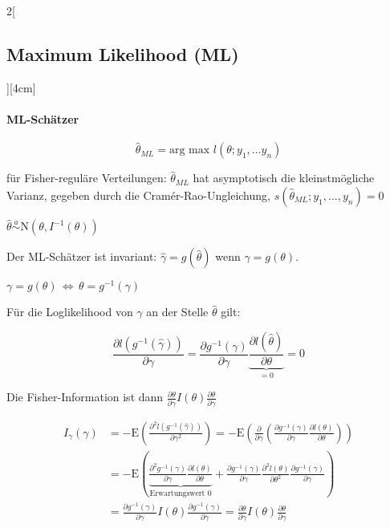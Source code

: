 \documentclass[8pt]{extarticle}
\begin{document}
\begin{multicols}{2}[\subsection{Maximum Likelihood (ML)}][4cm]
  \paragraph{ML-Schätzer}
   $$\hat{\theta}_{ML} = \text{arg max } l(\theta; y_1,...y_n)$$
   
\noindent für Fisher-reguläre Verteilungen: $\hat{\theta}_{ML}$ hat asymptotisch die kleinstmögliche Varianz, gegeben durch die Cramér-Rao-Ungleichung, 
   $s\left(\hat{\theta}_{ML};y_1,...,y_n\right) = 0$
   
$\hat{\theta} \overset{a}{\sim} \mathrm{N}\left(\theta, I^{-1}(\theta)\right)$
   
\noindent Der ML-Schätzer ist invariant: $\hat{\gamma} = g(\hat{\theta})$ wenn $\gamma = g(\theta)$. 
   
\begin{Proof}
$\gamma = g(\theta)\, \Leftrightarrow \,\theta = g^{-1}(\gamma)$

\noindent Für die Loglikelihood von $\gamma$ an der Stelle $\hat{\theta}$ gilt:

$$\frac{\partial l(g^{-1}(\hat{\gamma}))}{\partial \gamma} = \frac{\partial g^{-1}(\gamma)}{\partial\gamma} \underbrace{\frac{\partial l(\hat{\theta})}{\partial \theta}}_{=0} = 0$$
\end{Proof}   

\noindent Die Fisher-Information ist dann $\frac{\partial\theta}{\partial\gamma} I(\theta) \frac{\partial\theta}{\partial\gamma}$

\begin{Proof}
\vspace{-1.5em}
\begin{align*}
I_{\gamma}(\gamma) &= 
-\mathrm{E}\left(\frac{\partial^2 l(g^{-1}(\hat{\gamma}))}{\partial \gamma^2} \right)= 
-\mathrm{E}\left(\frac{\partial}{\partial\gamma} \left( \frac{\partial g^{-1}(\gamma)}{\partial\gamma} \frac{\partial l(\theta)}{\partial\theta} \right)\right) \\
&= -\mathrm{E}\left(\underbrace{\frac{\partial^2 g^{-1}(\gamma)}{\partial\gamma}\frac{\partial l(\theta)}{\partial\theta}}_{\text{Erwartungswert 0}} + \frac{\partial g^{-1}(\gamma)}{\partial\gamma}\frac{\partial^2l(\theta)}{\partial\theta^2}\frac{\partial g^{-1}(\gamma)}{\partial\gamma}\right) \\
&= \frac{\partial g^{-1}(\gamma)}{\partial\gamma} I(\theta) \frac{\partial g^{-1}(\gamma)}{\partial\gamma} = \frac{\partial \theta}{\partial\gamma} I(\theta) \frac{\partial \theta}{\partial\gamma}
\end{align*}
\end{Proof}


\end{multicols}
\end{document}
